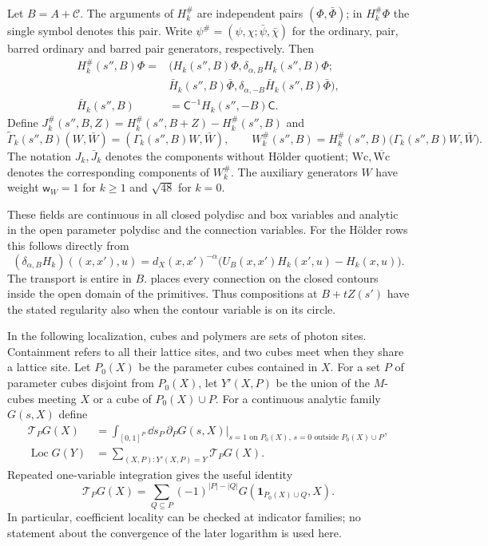 Let $B=A+\mathscr C$.
The arguments of $H_k^\#$ are independent pairs
$(\Phi,\bar\Phi)$; in $H_k^\#\Phi$ the single symbol denotes
this pair. Write
$\psi^\#=(\psi,\chi;\bar\psi,\bar\chi)$ for the ordinary,
pair, barred ordinary and barred pair generators, respectively.
Then
\[
 \begin{aligned}
 H_k^\#(s'',B)\Phi
   ={}&(H_k(s'',B)\Phi,\delta_{\alpha,B}H_k(s'',B)\Phi;\\
       &
       \bar H_k(s'',B)\bar\Phi,
                       \delta_{\alpha,-B}\bar H_k(s'',B)\bar\Phi),\\
 \bar H_k(s'',B)&=\mathsf C^{-1}H_k(s'',-B)\mathsf C.
 \end{aligned}
\]
Define
$J_k^\#(s'',B,Z)=H_k^\#(s'',B+Z)-H_k^\#(s'',B)$ and
\[
 \widetilde\Gamma_k(s'',B)(W,\bar W)
                         =(\Gamma_k(s'',B)W,\bar W),\qquad
 W_k^\#(s'',B)=H_k^\#(s'',B)
                         \big(\Gamma_k(s'',B)W,\bar W\big).
\]
The notation $J_k,\bar J_k$ denotes the components without
H\"older quotient; $\mathrm{Wc},\overline{\mathrm{Wc}}$ denotes
the corresponding components of $W_k^\#$.
The auxiliary generators $W$ have weight
$\mathsf w_W=1$ for $k\ge1$ and $\sqrt{48}$ for $k=0$.

These fields are continuous in all closed polydisc and box
variables and analytic in the open parameter polydisc and the
connection variables. For the H\"older rows this follows
directly from
\[
 (\delta_{\alpha,B}H_k)((x,x'),u)
   =d_X(x,x')^{-\alpha}
       \big(U_B(x,x')H_k(x',u)-H_k(x,u)\big).
\]
The transport is entire in $B$. 
places every connection on the closed contours inside the
open domain of the primitives. Thus compositions at
$B+tZ(s')$ have the stated regularity also when the contour
variable is on its circle.

In the following localization, cubes and polymers are sets
of photon sites. Containment refers to all their lattice sites,
and two cubes meet when they share a lattice site.
Let $P_0(X)$ be the parameter cubes contained in $X$.
For a set $P$ of parameter cubes disjoint from $P_0(X)$, let $Y'(X,P)$ be the union of
the $M$-cubes meeting $X$ or a cube of $P_0(X)\cup P$.
For a continuous analytic family $G(s,X)$ define
\begin{align}
 \mathcal T_PG(X)
  &=\int_{[0,1]^P}\dd s_P\,
       \partial_PG(s,X)
       \big|_{s=1\text{ on }P_0(X),\,
                    s=0\text{ outside }P_0(X)\cup P},
                          \label{eq:rgnl-interpolation}\\
 \operatorname{Loc}G(Y)
  &=\sum_{(X,P):Y'(X,P)=Y}\mathcal T_PG(X).
                          \label{eq:rgnl-localization}
\end{align}
Repeated one-variable integration gives the useful identity
\begin{equation}\label{eq:rgnl-finite-difference}
 \mathcal T_PG(X)=
    \sum_{Q\subseteq P}(-1)^{|P|-|Q|}
                                 G(\mathbf1_{P_0(X)\cup Q},X).
\end{equation}
In particular, coefficient locality can be checked at
indicator families; no statement about the convergence of
the later logarithm is used here.

